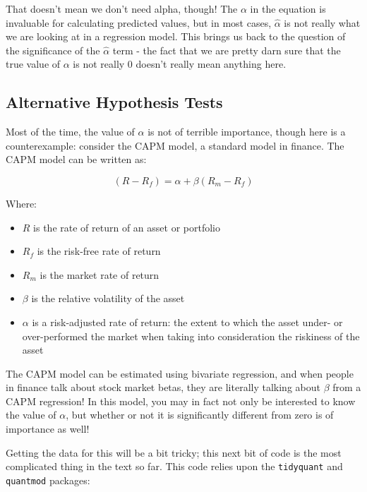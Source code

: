\documentclass[
  letterpaper,
]{book}
\providecommand{\tightlist}{%
  \setlength{\itemsep}{0pt}\setlength{\parskip}{0pt}}\usepackage{longtable,booktabs,array}
\begin{document}
That doesn't mean we don't need alpha, though! The \(\alpha\) in the
equation is invaluable for calculating predicted values, but in most
cases, \(\hat{\alpha}\) is not really what we are looking at in a
regression model. This brings us back to the question of the
significance of the \(\hat{\alpha}\) term - the fact that we are pretty
darn sure that the true value of \(\alpha\) is not really 0 doesn't
really mean anything here.

\subsection{Alternative Hypothesis
Tests}\label{alternative-hypothesis-tests}

Most of the time, the value of \(\hat{\alpha}\) is not of terrible
importance, though here is a counterexample: consider the CAPM model, a
standard model in finance. The CAPM model can be written as:

\begin{equation}
(R-R_f)=\alpha + \beta(R_m-R_f) 
\end{equation}

Where:

\begin{itemize}
\tightlist
\item
  \(R\) is the rate of return of an asset or portfolio
\item
  \(R_f\) is the risk-free rate of return
\item
  \(R_m\) is the market rate of return
\item
  \(\beta\) is the relative volatility of the asset
\item
  \(\alpha\) is a risk-adjusted rate of return: the extent to which the
  asset under- or over-performed the market when taking into
  consideration the riskiness of the asset
\end{itemize}

The CAPM model can be estimated using bivariate regression, and when
people in finance talk about stock market betas, they are literally
talking about \(\beta\) from a CAPM regression! In this model, you may
in fact not only be interested to know the value of \(\alpha\), but
whether or not it is significantly different from zero is of importance
as well!

Getting the data for this will be a bit tricky; this next bit of code is
the most complicated thing in the text so far. This code relies upon the
\texttt{tidyquant} and \texttt{quantmod} packages:
\end{document}
